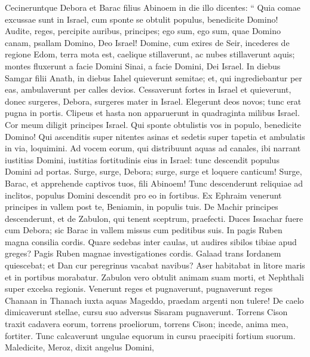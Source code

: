 \begin{biblechapter}
\begin{biblechapter}
\begin{biblechapter}
\begin{biblechapter}
\begin{biblechapter}
\verse Cecineruntque Debora et Barac filius Abinoem in die illo dicentes:
 \verse “ Quia comae excussae sunt in Israel,
 cum sponte se obtulit populus,
 benedicite Domino!
 \verse Audite, reges, percipite auribus, principes;
 ego sum, ego sum, quae Domino canam,
 psallam Domino, Deo Israel!
 \verse Domine, cum exires de Seir,
 incederes de regione Edom,
 terra mota est, caelique stillaverunt, ac nubes stillaverunt aquis;
 \verse montes fluxerunt a facie Domini Sinai,
 a facie Domini, Dei Israel.
 \verse In diebus Samgar filii Anath,
 in diebus Iahel quieverunt semitae; et, qui ingrediebantur per eas,
 ambulaverunt per calles devios.
 \verse Cessaverunt fortes in Israel et quieverunt,
 donec surgeres, Debora,
 surgeres mater in Israel.
 \verse Elegerunt deos novos;
 tunc erat pugna in portis.
 Clipeus et hasta non apparuerunt
 in quadraginta milibus Israel.
 \verse Cor meum diligit principes Israel.
 Qui sponte obtulistis vos in populo, benedicite Domino!
 \verse Qui ascenditis super nitentes asinas
 et sedetis super tapetia
 et ambulatis in via, loquimini.
 \verse Ad vocem eorum,
 qui distribuunt aquas ad canales,
 ibi narrant iustitias Domini,
 iustitias fortitudinis eius in Israel:
 tunc descendit populus Domini ad portas.
 \verse Surge, surge, Debora;
 surge, surge et loquere canticum!
 Surge, Barac, et apprehende captivos tuos,
 fili Abinoem!
 \verse Tunc descenderunt reliquiae ad inclitos,
 populus Domini descendit pro eo in fortibus.
 \verse Ex Ephraim venerunt principes in vallem
 post te, Beniamin, in populis tuis.
 De Machir principes descenderunt, et de Zabulon, qui tenent sceptrum, praefecti.
 \verse Duces Issachar fuere cum Debora;
 sic Barac in vallem missus cum peditibus suis.
 In pagis Ruben magna consilia cordis.
 \verse Quare sedebas inter caulas,
 ut audires sibilos tibiae apud greges?
 Pagis Ruben magnae investigationes cordis.
 \verse Galaad trans Iordanem quiescebat;
 et Dan cur peregrinus vacabat navibus?
 Aser habitabat in litore maris
 et in portibus morabatur.
 \verse Zabulon vero obtulit animam suam morti,
 et Nephthali super excelsa regionis. 
\verse Venerunt reges et pugnaverunt,
 pugnaverunt reges Chanaan
 in Thanach iuxta aquas Mageddo, praedam argenti non tulere!
 \verse De caelo dimicaverunt stellae,
 cursu suo adversus Sisaram pugnaverunt.
 \verse Torrens Cison traxit cadavera eorum,
 torrens proeliorum, torrens Cison; incede, anima mea, fortiter.
 \verse Tunc calcaverunt ungulae equorum
 in cursu praecipiti fortium suorum. \verse Maledicite, Meroz, dixit angelus Domini,

\end{biblechapter}
\end{biblechapter}
\end{biblechapter}
\end{biblechapter}
\end{biblechapter}
